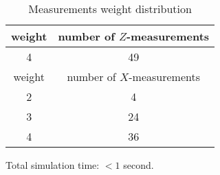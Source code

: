 \documentclass[12pt]{article}
\begin{document}
\begin{table}[h]
\centering
\begin{tabular}{c c}
\hline
weight & number of $Z$-measurements\\
\hline
4 & 49\\
\hline
\hline
weight & number of $X$-measurements\\
\hline
2 & 4\\
3 & 24\\
4 & 36\\
\hline
\end{tabular}
\caption{Measurements weight distribution}
\end{table}
\vspace{.3cm}



\vspace{2cm}
Total simulation time: $< 1$ second.
\end{document}
